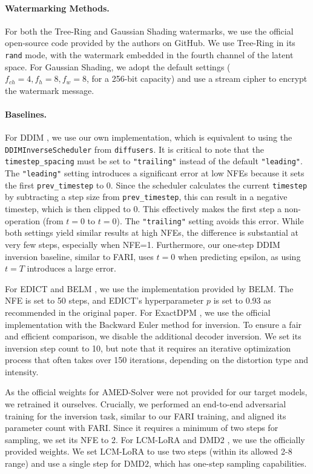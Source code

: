 \documentclass{article}
\begin{document}
\paragraph{Watermarking Methods.}
For both the Tree-Ring \citep{treering_2023} and Gaussian Shading \citep{gs_2024} watermarks, we use the official open-source code provided by the authors on GitHub. We use Tree-Ring in its \texttt{rand} mode, with the watermark embedded in the fourth channel of the latent space. For Gaussian Shading, we adopt the default settings ($f_{ch}=4, f_h=8, f_w=8$, for a 256-bit capacity) and use a stream cipher to encrypt the watermark message.

\paragraph{Baselines.}
For DDIM \citep{ddim_2021}, we use our own implementation, which is equivalent to using the \texttt{DDIMInverseScheduler} from \texttt{diffusers}. It is critical to note that the \texttt{timestep\_spacing} must be set to \texttt{"trailing"} instead of the default \texttt{"leading"}. The \texttt{"leading"} setting introduces a significant error at low NFEs because it sets the first \texttt{prev\_timestep} to 0. Since the scheduler calculates the current \texttt{timestep} by subtracting a step size from \texttt{prev\_timestep}, this can result in a negative timestep, which is then clipped to 0. This effectively makes the first step a non-operation (from $t=0$ to $t=0$). The \texttt{"trailing"} setting avoids this error. While both settings yield similar results at high NFEs, the difference is substantial at very few steps, especially when NFE=1. Furthermore, our one-step DDIM inversion baseline, similar to FARI, uses $t=0$ when predicting epsilon, as using $t=T$ introduces a large error.

For EDICT \citep{edict2023} and BELM \citep{belm2024}, we use the implementation provided by BELM. The NFE is set to 50 steps, and EDICT's hyperparameter $p$ is set to 0.93 as recommended in the original paper. For ExactDPM \citep{exactdpm2024}, we use the official implementation with the Backward Euler method for inversion. To ensure a fair and efficient comparison, we disable the additional decoder inversion. We set its inversion step count to 10, but note that it requires an iterative optimization process that often takes over 150 iterations, depending on the distortion type and intensity.

As the official weights for AMED-Solver \citep{amed2024} were not provided for our target models, we retrained it ourselves. Crucially, we performed an end-to-end adversarial training for the inversion task, similar to our FARI training, and aligned its parameter count with FARI. Since it requires a minimum of two steps for sampling, we set its NFE to 2. For LCM-LoRA \citep{lcmlora2023} and DMD2 \citep{dmd2_2024}, we use the officially provided weights. We set LCM-LoRA to use two steps (within its allowed 2-8 range) and use a single step for DMD2, which has one-step sampling capabilities.
\end{document}
